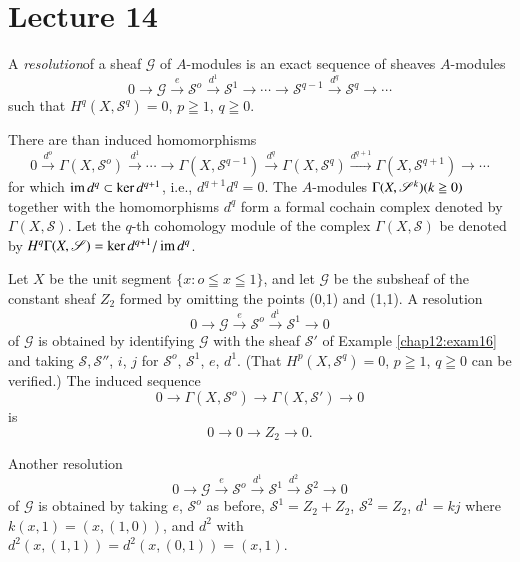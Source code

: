 \chapter{Lecture 14} %

\begin{defi*}
A {\em resolution}\pageoriginale of a sheaf $\mathscr{G}$ of
$A$-modules is an exact sequence of sheaves $A$-modules  
$$
0 \to \mathscr{G} \xrightarrow{e} \mathscr{S}^o \xrightarrow{d^1}
\mathscr{S}^1 \to \cdots \to \mathscr{S}^{q-1} \xrightarrow{d^q}
\mathscr{S}^q \to \cdots  
$$
such that $H^q(X,  \mathscr{S}^q)= 0$, $p \geqq 1$, $q \geqq 0$. 
\end{defi*}

There are than induced homomorphisms
{\fontsize{10}{12}\selectfont
$$
0  \xrightarrow{d^o} \Gamma(X, \mathscr{S}^o) \xrightarrow{d^1} \cdots
\to  \Gamma(X, \mathscr{S}^{q-1}) \xrightarrow{d^q} \Gamma(X,
\mathscr{S}^q) \xrightarrow{d^{q+1}} \Gamma (X, \mathscr{S}^{q+1})
\to \cdots 
$$}
for which $\operatorname{im} d^q \subset \ker d^{q+1}$, i.e., $d^{q+1} d^{q}=0$. The
$A$-modules $\Gamma(X, \mathscr{S}^k)\break  (k \geqq 0)$ together with the
homomorphisms $d^q$ form a formal cochain complex denoted by
$\Gamma(X, \mathscr{S})$. Let the $q$-th cohomology module of the
complex $\Gamma (X, \mathscr{S})$ be denoted by $H^q \Gamma(X,
\mathscr{S})= \ker d^{q+1}/ \operatorname{im} d^q$. 

\begin{exam}%
Let $X$  be the unit segment $\bigg\{ x: o \leqq x \leqq 1 \bigg\}$,
and let $\mathscr{G}$ be the subsheaf of the constant sheaf $Z_2$
formed  by omitting the points (0,1) and (1,1). A resolution   
\begin{equation*}
0 \to \mathscr{G} \xrightarrow{e} \mathscr{S}^o \xrightarrow{d^1}
\mathscr{S}^1 \to 0 \tag{1} 
\end{equation*}
of $\mathscr{G}$ is obtained by identifying $\mathscr{G}$ with the 
sheaf $\mathscr{S}'$ of Example \ref{chap12:exam16} and taking $\mathscr{S},
\mathscr{S}''$, $i$, $j$ for $\mathscr{S}^o$, $\mathscr{S}^1$, $e$,
$d^1$. (That $H^p(X, \mathscr{S}^q)=0$, $p \geqq 1$, $q \geqq 0$ can be
verified.) The induced sequence  
$$
0 \to \Gamma(X, \mathscr{S}^o) \to \Gamma (X, \mathscr{S}') \to 0  
$$ 
is\pageoriginale 
$$
0 \to 0  \to Z_2  \to  0.
$$
  \end{exam}  
  
  Another resolution
  \begin{equation*}
0 \to  \mathscr{G} \xrightarrow{e} \mathscr{S}^o \xrightarrow{d^1}
\mathscr{S}^1 \xrightarrow{d^2} \mathscr{S}^2 \to 0 \tag{2} 
  \end{equation*}  
  of $\mathscr{G}$ is obtained  by taking $e$, $\mathscr{S}^o$ as
  before, $\mathscr{S}^1 = Z_2 +Z_2$, $\mathscr{S}^2= Z_2$, $d^1= kj$
  where $k(x,1)  = (x, (1,0))$, and $d^2$ with $d^2 (x,
  (1,1))=d^2(x,(0,1))= (x,1)$. 
  
